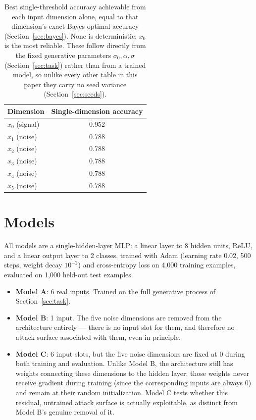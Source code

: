 \documentclass[11pt]{article}
\begin{document}
\begin{table}[h]
\centering
\caption{Best single-threshold accuracy achievable from each input
dimension alone, equal to that dimension's exact Bayes-optimal accuracy
(Section~\ref{sec:bayes}). None is deterministic; $x_0$ is the most
reliable. These follow directly from the fixed generative parameters
$\sigma_0, \alpha, \sigma$ (Section~\ref{sec:task}) rather than from a
trained model, so unlike every other table in this paper they carry no
seed variance (Section~\ref{sec:seeds}).}
\label{tab:sanity}
\begin{tabular}{lc}
\toprule
Dimension & Single-dimension accuracy \\
\midrule
$x_0$ (signal) & 0.952 \\
$x_1$ (noise) & 0.788 \\
$x_2$ (noise) & 0.788 \\
$x_3$ (noise) & 0.788 \\
$x_4$ (noise) & 0.788 \\
$x_5$ (noise) & 0.788 \\
\bottomrule
\end{tabular}
\end{table}

\section{Models}

All models are a single-hidden-layer MLP: a linear layer to 8 hidden
units, ReLU, and a linear output layer to 2 classes, trained with Adam
(learning rate $0.02$, 500 steps, weight decay $10^{-2}$) and
cross-entropy loss on 4{,}000 training examples, evaluated on 1{,}000 held-out
test examples.

\begin{itemize}
\item \textbf{Model A}: 6 real inputs. Trained on the full generative
process of Section~\ref{sec:task}.
\item \textbf{Model B}: 1 input. The five noise dimensions are removed
from the architecture entirely --- there is no input slot for them, and
therefore no attack surface associated with them, even in principle.
\item \textbf{Model C}: 6 input slots, but the five noise dimensions are
fixed at $0$ during both training and evaluation. Unlike Model B, the
architecture still has weights connecting these dimensions to the hidden
layer; those weights never receive gradient during training (since the
corresponding inputs are always $0$) and remain at their random
initialization. Model C tests whether this residual, untrained attack
surface is actually exploitable, as distinct from Model B's genuine
removal of it.
\end{itemize}
\end{document}
